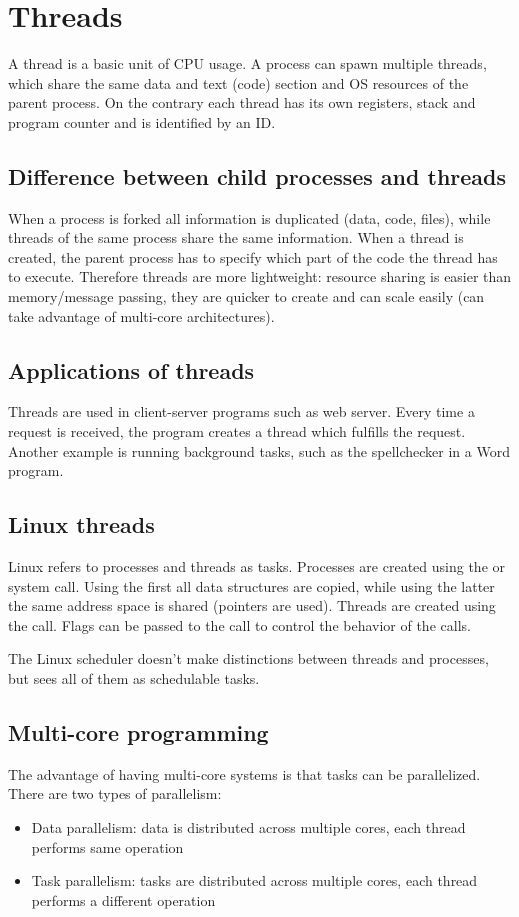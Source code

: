 \section{Threads}
A thread is a basic unit of CPU usage. A process can spawn multiple threads, which share the same data and text (code) section and OS resources of the parent process. On the contrary each thread has its own registers, stack and program counter and is identified by an ID.


\subsection{Difference between child processes and threads}
When a process is forked all information is duplicated (data, code, files), while threads of the same process share the same information. When a thread is created, the parent process has to specify which part of the code the thread has to execute. Therefore threads are more lightweight: resource sharing is easier than memory/message passing, they are quicker to create and can scale easily (can take advantage of multi-core architectures).

\subsection{Applications of threads}
Threads are used in client-server programs such as web server. Every time a request is received, the program creates a thread which fulfills the request. Another example is running background tasks, such as the spellchecker in a Word program.

\subsection{Linux threads}
Linux refers to processes and threads as tasks. Processes are created using the  or  system call. Using the first all data structures are copied, while using the latter the same address space is shared (pointers are used). Threads are created using the  call. Flags can be passed to the call to control the behavior of the calls.

The Linux scheduler doesn't make distinctions between threads and processes, but sees all of them as schedulable tasks.

\subsection{Multi-core programming}
The advantage of having multi-core systems is that tasks can be parallelized. There are two types of parallelism:
\begin{itemize}
  \item Data parallelism: data is distributed across multiple cores, each thread performs same operation
  \item Task parallelism: tasks are distributed across multiple cores, each thread performs a different operation
\end{itemize}

